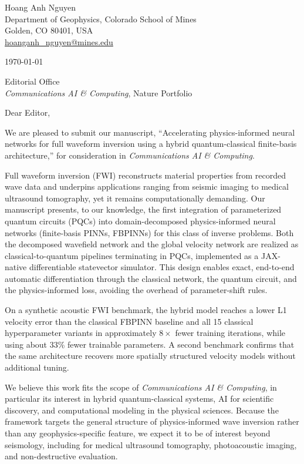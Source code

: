 \documentclass[11pt]{article}
\begin{document}
\noindent
Hoang Anh Nguyen \\
Department of Geophysics, Colorado School of Mines \\
Golden, CO 80401, USA \\
\href{mailto:hoanganh_nguyen@mines.edu}{hoanganh\_nguyen@mines.edu}

\vspace{0.5em}
\noindent \today

\vspace{0.5em}
\noindent
Editorial Office \\
\emph{Communications AI \& Computing}, Nature Portfolio

\vspace{1em}
\noindent Dear Editor,

We are pleased to submit our manuscript, ``Accelerating physics-informed neural networks for full waveform inversion using a hybrid quantum-classical finite-basis architecture,'' for consideration in \emph{Communications AI \& Computing}.

Full waveform inversion (FWI) reconstructs material properties from recorded wave data and underpins applications ranging from seismic imaging to medical ultrasound tomography, yet it remains computationally demanding. Our manuscript presents, to our knowledge, the first integration of parameterized quantum circuits (PQCs) into domain-decomposed physics-informed neural networks (finite-basis PINNs, FBPINNs) for this class of inverse problems. Both the decomposed wavefield network and the global velocity network are realized as classical-to-quantum pipelines terminating in PQCs, implemented as a JAX-native differentiable statevector simulator. This design enables exact, end-to-end automatic differentiation through the classical network, the quantum circuit, and the physics-informed loss, avoiding the overhead of parameter-shift rules.

On a synthetic acoustic FWI benchmark, the hybrid model reaches a lower L1 velocity error than the classical FBPINN baseline and all 15 classical hyperparameter variants in approximately $8\times$ fewer training iterations, while using about $33$\% fewer trainable parameters. A second benchmark confirms that the same architecture recovers more spatially structured velocity models without additional tuning.

We believe this work fits the scope of \emph{Communications AI \& Computing}, in particular its interest in hybrid quantum-classical systems, AI for scientific discovery, and computational modeling in the physical sciences. Because the framework targets the general structure of physics-informed wave inversion rather than any geophysics-specific feature, we expect it to be of interest beyond seismology, including for medical ultrasound tomography, photoacoustic imaging, and non-destructive evaluation.
\end{document}
